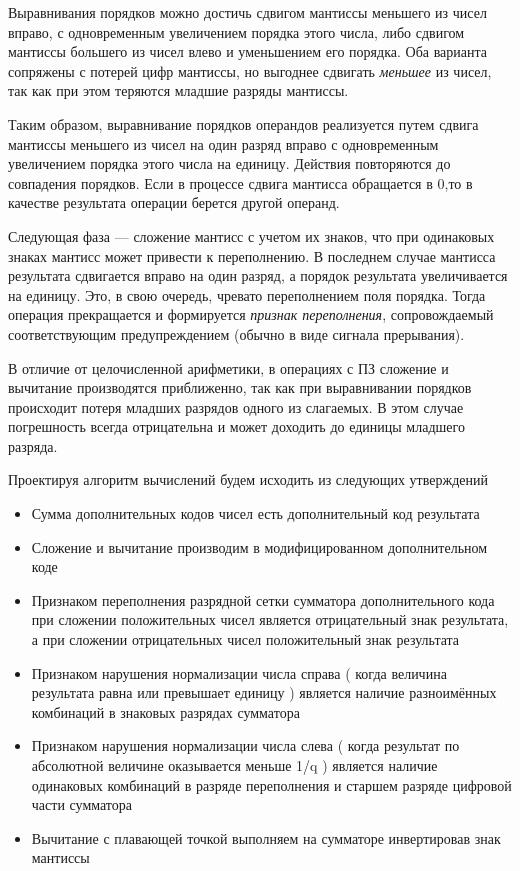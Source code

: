 \documentclass[a4paper,14pt]{extarticle}
\begin{document}
Выравнивания порядков можно достичь сдвигом мантиссы меньшего из чисел вправо, с одновременным увеличением порядка этого числа, либо сдвигом мантиссы большего из чисел влево и уменьшением его порядка. Оба варианта сопряжены с потерей цифр мантиссы, но выгоднее сдвигать \textit{меньшее} из чисел, так как при этом теряются младшие разряды мантиссы.

Таким образом, выравнивание порядков операндов реализуется путем сдвига мантиссы меньшего из чисел на один разряд вправо с одновременным увеличением порядка этого числа на единицу. Действия повторяются до совпадения порядков. Если в процессе сдвига мантисса обращается в 0,то в качестве результата операции берется другой операнд.

Следующая фаза --- сложение мантисс с учетом их знаков, что при одинаковых знаках мантисс может привести к переполнению. В последнем случае мантисса результата сдвигается вправо на один разряд, а порядок результата увеличивается на единицу. Это, в свою очередь, чревато переполнением поля порядка. Тогда операция прекращается и формируется \textit{признак переполнения}, сопровождаемый соответствующим предупреждением (обычно в виде сигнала прерывания).

В отличие от целочисленной арифметики, в операциях с ПЗ сложение и вычитание производятся приближенно, так как при выравнивании порядков происходит потеря младших разрядов одного из слагаемых. В этом случае погрешность всегда отрицательна и может доходить до единицы младшего разряда.

Проектируя алгоритм вычислений будем исходить из следующих утверждений
\begin{itemize}
	\item Сумма дополнительных кодов чисел есть дополнительный код результата
	\item Сложение и вычитание производим в модифицированном дополнительном коде
	\item Признаком переполнения разрядной сетки сумматора дополнительного кода при сложении положительных чисел является отрицательный знак результата, а при сложении отрицательных чисел положительный знак результата
	\item Признаком нарушения нормализации числа справа ( когда величина результата равна или превышает единицу ) является наличие разноимённых комбинаций в знаковых разрядах сумматора
	\item  Признаком нарушения нормализации числа слева ( когда результат по абсолютной величине оказывается меньше 1/q ) является наличие одинаковых комбинаций в разряде переполнения и старшем разряде цифровой части сумматора
	\item Вычитание с плавающей точкой выполняем на сумматоре инвертировав знак мантиссы
\end{itemize}
\end{document}
